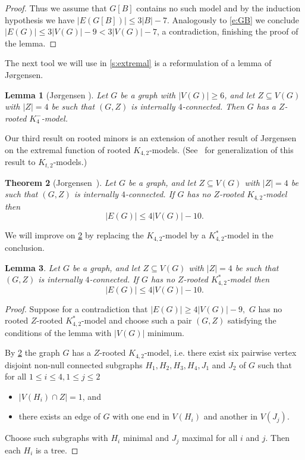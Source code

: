 \documentclass[reqno,final,12pt]{amsart}
\newtheorem{thm}{Theorem}
\newtheorem{lem}[thm]{Lemma}
\begin{document}
{\begin{proof}
Thus  we assume that $G[B]$ contains no such model and by the induction hypothesis we have $|E(G[B])| \leq 3|B|-7$. Analogously to \eqref{e:GB} we conclude $|E(G)| \leq 3|V(G)|-9 < 3|V(G)|-7$, a contradiction, finishing the proof of the lemma.  
\end{proof}	

The next tool we will use in \cref{s:extremal} is a reformulation of a lemma of J{\o}rgensen.

\begin{lem}[J{\o}rgensen {\cite[Lemma 16 (2)]{Jorgensen1994}}]\label{c:RST64} Let $G$ be a graph with $|V(G)| \geq 6$, and let $Z \subseteq V(G)$ with  $|Z|=4$ be such that $(G,Z)$ is internally $4$-connected. Then $G$ has a $Z$-rooted $K^-_4$-model.
\end{lem}

Our third result on rooted minors is an extension of another result of  J{\o}rgensen on the extremal function of rooted $K_{4,2}$-models. (See~\cite{Wollan2008} for generalization of this result to $K_{t,2}$-models.) 


\begin{thm}[Jorgensen~{\cite[Lemma 17]{Jorgensen1994}}]\label{l:K42}
	Let $G$ be a graph, and let $Z \subseteq V(G)$ with $|Z|=4$ be such that $(G,Z)$ is internally $4$-connected. If $G$ has no $Z$-rooted $K_{4,2}$-model then $$|E(G)| \leq 4|V(G)|-10.$$ 
\end{thm}

We will improve on \cref{l:K42} by replacing the  $K_{4,2}$-model by a $K^*_{4,2}$-model in the conclusion.

 \begin{lem}\label{l:K42star}
	Let $G$ be a graph, and let $Z \subseteq V(G)$ with $|Z|=4$ be such that $(G,Z)$ is internally $4$-connected. If $G$ has no $Z$-rooted $K^*_{4,2}$-model then $$|E(G)| \leq 4|V(G)|-10.$$ 
\end{lem}
	
\begin{proof} 
	Suppose for a contradiction that $|E(G)| \geq 4|V(G)|-9,$  $G$ has no rooted  $Z$-rooted $K^*_{4,2}$-model and choose such a pair $(G,Z)$ satisfying the conditions of the lemma with $|V(G)|$ minimum.
	
	By \cref{l:K42} the graph $G$ has a $Z$-rooted $K_{4,2}$-model, i.e. there exist  six pairwise vertex disjoint non-null connected subgraphs $H_1,H_2,H_3,H_4,J_1$ and $J_2$ of $G$ such that for all $1 \leq i \leq 4, 1 \leq j \leq 2$ \begin{itemize}
		\item $|V(H_i) \cap Z|=1$, and
		\item there exists an edge of $G$ with one end in $V(H_i)$ and another in $V(J_j)$.
	\end{itemize} 
Choose such subgraphs with $H_i$ minimal and $J_j$ maximal for all $i$ and $j$.  Then each $H_i$ is a tree. 
	

\end{proof}}
\end{document}
